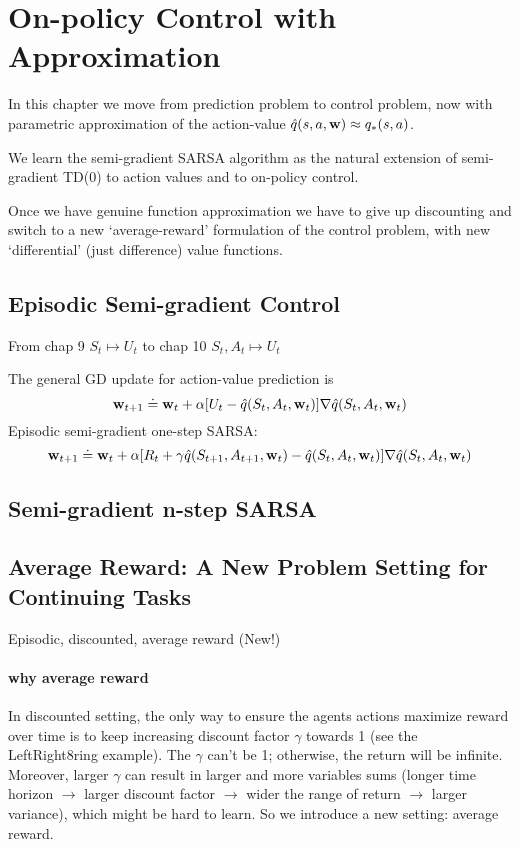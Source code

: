 \documentclass[sutton_barto_notes.tex]{subfiles}
\begin{document}
\newpage
\section{On-policy Control with Approximation}

In this chapter we move from prediction problem to control problem, now with parametric approximation of the action-value $\hat{q}(s,a,{\operatorname*{\mathbf{w}}})\approx q_*(s,a)$.

We learn the semi-gradient SARSA algorithm as the natural extension of semi-gradient TD(0) to action values and to on-policy control.

Once we have genuine function approximation we have to give up discounting and switch to a new `average-reward' formulation of the control problem, with new `differential' (just difference) value functions.

\subsection{Episodic Semi-gradient Control}

From chap 9 $S_t \mapsto U_t$ to chap 10 $S_t, A_t \mapsto U_t$

The general GD update for action-value prediction is
$${\operatorname*{\mathbf{w}}}_{t+1} \doteq {\operatorname*{\mathbf{w}}}_t + \alpha[U_t - \hat{q}(S_t, A_t, {\operatorname*{\mathbf{w}}}_t)]\nabla \hat{q}(S_t, A_t, {\operatorname*{\mathbf{w}}}_t)$$
Episodic semi-gradient one-step SARSA:
$${\operatorname*{\mathbf{w}}}_{t+1} \doteq {\operatorname*{\mathbf{w}}}_t + \alpha[R_{t} + \gamma\hat{q}(S_{t+1}, A_{t+1}, {\operatorname*{\mathbf{w}}}_t) - \hat{q}(S_t, A_t, {\operatorname*{\mathbf{w}}}_t)]\nabla\hat{q}(S_t, A_t, {\operatorname*{\mathbf{w}}}_t)$$

\subsection{Semi-gradient n-step SARSA}
\subsection{Average Reward: A New Problem Setting for Continuing Tasks}
Episodic, discounted, average reward (New!)

\paragraph{why average reward} In discounted setting, the only way to ensure the agents actions maximize reward over time is to keep increasing discount factor $\gamma$ towards 1 (see the LeftRight8ring example). The $\gamma$ can't be 1; otherwise, the return will be infinite. Moreover, larger $\gamma$ can result in larger and more variables sums (longer time horizon $\to$ larger discount factor $\to$ wider the range of return $\to$ larger variance), which might be hard to learn. So we introduce a new setting: average reward.
\end{document}
